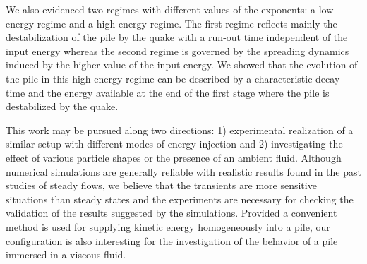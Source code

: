 We also evidenced two regimes with different values of the exponents: 
a low-energy regime and a high-energy regime. The first regime  
reflects mainly the destabilization of the pile by the quake with a run-out 
time 
independent of the input energy whereas the second regime is governed by the 
spreading dynamics induced by the higher value of the input energy. We showed 
that the evolution of the pile in this high-energy regime can be described by a 
characteristic decay time and the energy available at the end of the first 
stage where the pile is destabilized by the quake. 

This work may be pursued along two directions: 1) experimental 
realization of a similar setup with different modes of energy injection and 
2) investigating the effect of various particle shapes or the presence of an 
ambient fluid. Although numerical simulations are generally reliable 
with realistic results found in the past studies of steady flows, we believe 
that the transients are more sensitive situations than steady states and the  
experiments are necessary for checking the validation of the results suggested 
by the simulations. Provided a convenient method is used for supplying kinetic 
energy homogeneously into a pile, our configuration is also interesting for 
the investigation of the behavior of a pile immersed in a viscous 
fluid.
